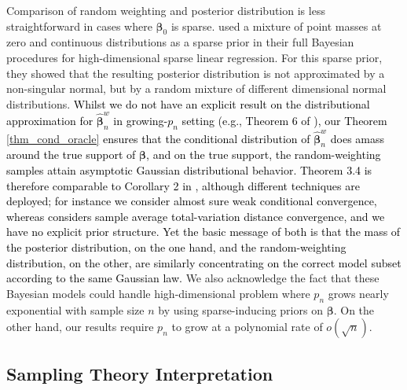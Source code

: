 \documentclass[ejs,authoryear,linksfromyear]{imsart}
\newcommand{\bnw}{\widehat{\bm{\beta}}_n^w} %
\numberwithin{equation}{section}
\theoremstyle{plain}
\begin{document}
Comparison of random weighting and posterior
distribution is less straightforward in cases where $\bm{\beta}_0$ is sparse. \citet{Castillo2015} used a mixture of point masses at zero and continuous distributions as a sparse prior in their full Bayesian procedures for high-dimensional sparse linear regression. For this sparse prior, they showed that the resulting posterior distribution is not approximated by a non-singular normal, but by a random mixture of different dimensional normal distributions.
\textcolor{black}{Whilst we do not have an explicit result on the distributional approximation for $\bnw$ in growing-$p_n$ setting (e.g., Theorem 6 of \citet{Castillo2015}), our Theorem \ref{thm_cond_oracle} ensures that the conditional distribution of $\bnw$ does amass around the true support of $\bm{\beta}$, and on the true support, the random-weighting samples attain asymptotic Gaussian distributional behavior. Theorem 3.4 is therefore comparable to Corollary 2 in \citet{Castillo2015}, although different techniques are deployed; for instance we consider almost sure weak conditional convergence, whereas \citet{Castillo2015} considers sample average total-variation distance convergence, and we have no explicit prior structure.  Yet the basic message of both is that the mass of the posterior distribution, on the one hand, and the random-weighting distribution, on the other, are similarly concentrating on the correct model subset according to the same Gaussian law.} We also acknowledge the fact that these Bayesian models could handle high-dimensional problem where $p_n$ grows nearly exponential with sample size $n$ by using sparse-inducing priors on $\bm{\beta}$. On the other hand, our results require $p_n$ to grow at a polynomial rate of $o(\sqrt{n})$.


\subsection{Sampling Theory Interpretation}
\end{document}
